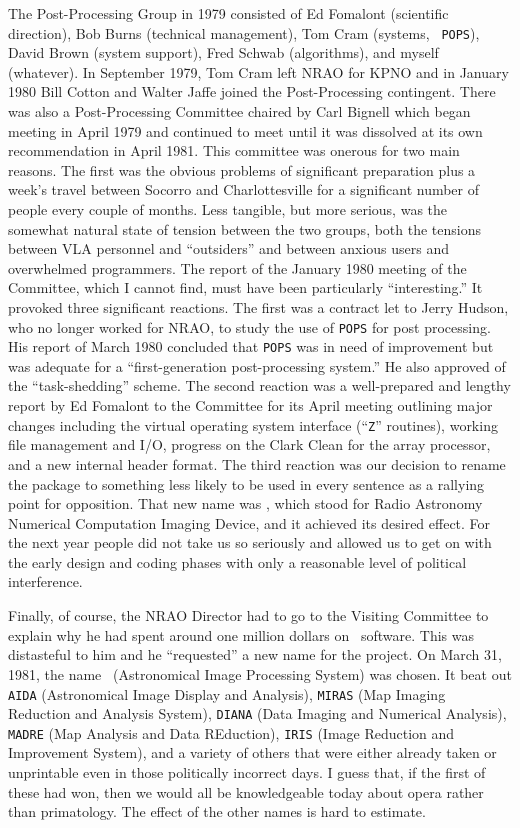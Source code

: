 The Post-Processing Group in 1979 consisted of Ed Fomalont (scientific
direction), Bob Burns (technical management), Tom Cram (systems, {\tt
POPS}), David Brown (system support), Fred Schwab (algorithms), and
myself (whatever).  In September 1979, Tom Cram left NRAO for KPNO and
in January 1980 Bill Cotton and Walter Jaffe joined the Post-Processing
contingent.  There was also a Post-Processing Committee
chaired by Carl Bignell which began meeting in April 1979 and
continued to meet until it was dissolved at its own recommendation in
April 1981.  This committee was onerous for two main reasons.  The
first was the obvious problems of significant preparation plus a
week's travel between Socorro and Charlottesville for a significant
number of people every couple of months.  Less tangible, but more
serious, was the somewhat natural state of tension between the two
groups, both the tensions between VLA personnel and ``outsiders'' and
between anxious users and overwhelmed programmers.  The report of the
January 1980 meeting of the Committee, which I cannot find, must have
been particularly ``interesting.''  It provoked three significant
reactions.  The first was a contract let to Jerry Hudson, who no
longer worked for NRAO, to study the use of {\tt POPS} for post
processing.  His report of March 1980 concluded that {\tt POPS} was in
need of improvement but was adequate for a ``first-generation
post-processing system.''  He also approved of the ``task-shedding''
scheme.  The second reaction was a well-prepared and lengthy report by
Ed Fomalont to the Committee for its April meeting outlining major
changes including the virtual operating system interface (``{\tt Z}''
routines), working file management and I/O, progress on the Clark
Clean for the array processor, and a new internal header format.  The
third reaction was our decision to rename the package to something
less likely to be used in every sentence as a rallying point for
opposition.  That new name was \RANCID, which stood for Radio
Astronomy Numerical Computation Imaging Device, and it achieved its
desired effect.  For the next year people did not take us so seriously
and allowed us to get on with the early design and coding phases with
only a reasonable level of political interference.

Finally, of course, the NRAO Director had to go to the Visiting
Committee to explain why he had spent around one million dollars on
\RANCID\ software.  This was distasteful to him and he ``requested'' a
new name for the project.  On March 31, 1981, the name \AIPS\
(Astronomical Image Processing System) was chosen.  It beat out {\tt
AIDA} (Astronomical Image Display and Analysis), {\tt MIRAS} (Map
Imaging Reduction and Analysis System), {\tt DIANA} (Data Imaging and
Numerical Analysis), {\tt MADRE} (Map Analysis and Data REduction),
{\tt IRIS} (Image Reduction and Improvement System), and a variety of
others that were either already taken or unprintable even in those
politically incorrect days.  I guess that, if the first of these had
won, then we would all be knowledgeable today about opera rather than
primatology.  The effect of the other names is hard to estimate.

